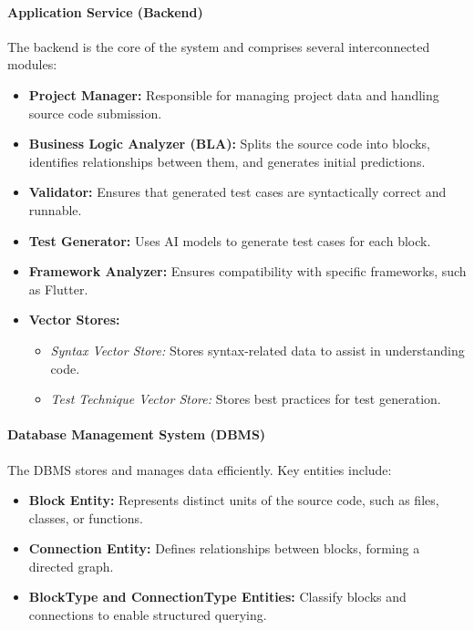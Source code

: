 \paragraph{Application Service (Backend)}

\hspace{0.5cm}The backend is the core of the system and comprises several interconnected modules:
\begin{itemize}
    \item \textbf{Project Manager:} Responsible for managing project data and handling source code submission.
    \item \textbf{Business Logic Analyzer (BLA):} Splits the source code into blocks, identifies relationships between them, and generates initial predictions.
    \item \textbf{Validator:} Ensures that generated test cases are syntactically correct and runnable.
    \item \textbf{Test Generator:} Uses AI models to generate test cases for each block.
    \item \textbf{Framework Analyzer:} Ensures compatibility with specific frameworks, such as Flutter.
    \item \textbf{Vector Stores:}
        \begin{itemize}
            \item \textit{Syntax Vector Store:} Stores syntax-related data to assist in understanding code.
            \item \textit{Test Technique Vector Store:} Stores best practices for test generation.
        \end{itemize}
\end{itemize}

\paragraph{Database Management System (DBMS)}

The DBMS stores and manages data efficiently. Key entities include:
\begin{itemize}
    \item \textbf{Block Entity:} Represents distinct units of the source code, such as files, classes, or functions.
    \item \textbf{Connection Entity:} Defines relationships between blocks, forming a directed graph.
    \item \textbf{BlockType and ConnectionType Entities:} Classify blocks and connections to enable structured querying.
\end{itemize}


